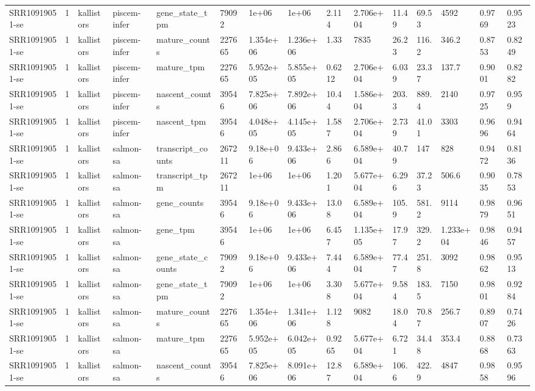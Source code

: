 \begin{tabular}{lllllllllllllll}
SRR10919051-se & 1 & kallistors & piscem-infer & gene\_state\_tpm & 79092 & 1e+06 & 1e+06 & 2.114 & 2.706e+04 & 11.49 & 69.53 & 4592 & 0.9769 & 0.9523 \\
SRR10919051-se & 1 & kallistors & piscem-infer & mature\_counts & 227665 & 1.354e+06 & 1.236e+06 & 1.33 & 7835 & 26.23 & 116.2 & 346.2 & 0.8753 & 0.8249 \\
SRR10919051-se & 1 & kallistors & piscem-infer & mature\_tpm & 227665 & 5.952e+05 & 5.855e+05 & 0.6212 & 2.706e+04 & 6.039 & 23.37 & 137.7 & 0.9001 & 0.8282 \\
SRR10919051-se & 1 & kallistors & piscem-infer & nascent\_counts & 39546 & 7.825e+06 & 7.892e+06 & 10.44 & 1.586e+04 & 203.3 & 889.4 & 2140 & 0.9725 & 0.959 \\
SRR10919051-se & 1 & kallistors & piscem-infer & nascent\_tpm & 39546 & 4.048e+05 & 4.145e+05 & 1.587 & 2.706e+04 & 2.739 & 41.01 & 3303 & 0.9696 & 0.9464 \\
SRR10919051-se & 1 & kallistors & salmon-sa & transcript\_counts & 267211 & 9.18e+06 & 9.433e+06 & 2.866 & 6.589e+04 & 40.79 & 147 & 828 & 0.9472 & 0.8136 \\
SRR10919051-se & 1 & kallistors & salmon-sa & transcript\_tpm & 267211 & 1e+06 & 1e+06 & 1.201 & 5.677e+04 & 6.296 & 37.23 & 506.6 & 0.9035 & 0.7853 \\
SRR10919051-se & 1 & kallistors & salmon-sa & gene\_counts & 39546 & 9.18e+06 & 9.433e+06 & 13.08 & 6.589e+04 & 105.9 & 581.2 & 9114 & 0.9879 & 0.9651 \\
SRR10919051-se & 1 & kallistors & salmon-sa & gene\_tpm & 39546 & 1e+06 & 1e+06 & 6.457 & 1.135e+05 & 17.97 & 329.2 & 1.233e+04 & 0.9846 & 0.9457 \\
SRR10919051-se & 1 & kallistors & salmon-sa & gene\_state\_counts & 79092 & 9.18e+06 & 9.433e+06 & 7.444 & 6.589e+04 & 77.47 & 251.8 & 3092 & 0.9862 & 0.9513 \\
SRR10919051-se & 1 & kallistors & salmon-sa & gene\_state\_tpm & 79092 & 1e+06 & 1e+06 & 3.308 & 5.677e+04 & 9.584 & 183.5 & 7150 & 0.9801 & 0.9284 \\
SRR10919051-se & 1 & kallistors & salmon-sa & mature\_counts & 227665 & 1.354e+06 & 1.341e+06 & 1.128 & 9082 & 18.04 & 70.87 & 256.7 & 0.8907 & 0.7426 \\
SRR10919051-se & 1 & kallistors & salmon-sa & mature\_tpm & 227665 & 5.952e+05 & 6.042e+05 & 0.9265 & 5.677e+04 & 6.721 & 34.48 & 353.4 & 0.8868 & 0.7363 \\
SRR10919051-se & 1 & kallistors & salmon-sa & nascent\_counts & 39546 & 7.825e+06 & 8.091e+06 & 12.87 & 6.589e+04 & 106.6 & 422.9 & 4847 & 0.9858 & 0.9596 \\

\end{tabular}
